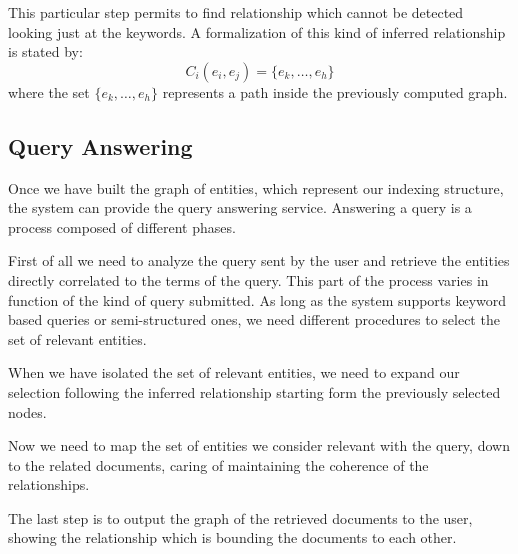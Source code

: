 \documentclass{acm_proc_article-sp-sigmod07}
\begin{document}
This particular step permits to find relationship which cannot be detected
looking just at the keywords. A formalization of this kind of inferred
relationship is stated by:
$$
C_{i}(e_{i}, e_{j}) = \{e_{k}, \dots, e_{h}\}
$$
where the set $\{e_{k}, \dots, e_{h}\}$ represents a path inside the
previously computed graph.

\subsection{Query Answering}
Once we have built the graph of entities, which represent our indexing
structure, the system can provide the query answering service.
Answering a query is a process composed of different phases.

First of all we need to analyze the query sent by the user and retrieve
the entities directly correlated to the terms of the query.
This part of the process varies in function of the kind of query
submitted. As long as the system supports keyword based queries or
semi-structured ones, we need different procedures to select the set of
relevant entities.

When we have isolated the set of relevant entities, we need to expand our
selection following the inferred relationship starting form the previously
selected nodes.

Now we need to map the set of entities we consider relevant with the
query, down to the related documents, caring of maintaining the coherence
of the relationships.

The last step is to output the graph of the retrieved documents to the
user, showing the relationship which is bounding the documents to each
other.
\end{document}
